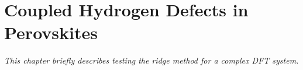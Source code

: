 \chapter{Coupled Hydrogen Defects in Perovskites}
\label{chap:perovskites}

\textit{This chapter briefly describes testing the ridge method for a complex DFT system.}



